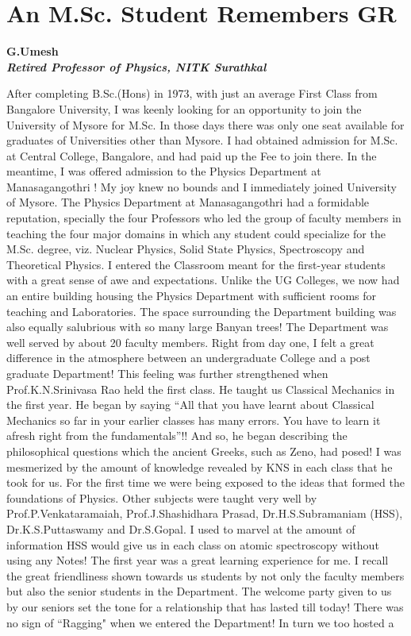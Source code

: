 \chapter{An M.Sc. Student Remembers GR}\label{chap8}


\begin{center}
\textbf{G.Umesh}\\
\textbf{\textit{Retired Professor of Physics, NITK Surathkal}}
\end{center}

After completing B.Sc.(Hons) in 1973, with just an average First Class from Bangalore University, I was keenly looking for an opportunity to join the University of Mysore for M.Sc. In those days there was only one seat available for graduates of Universities other than Mysore. I had obtained admission for M.Sc. at Central College, Bangalore, and had paid up the Fee to join there. In the meantime, I was offered admission to the Physics Department at Manasagangothri ! My joy knew no bounds and I immediately joined University of Mysore. The Physics Department at Manasagangothri had a formidable reputation, specially the four Professors who led the group of faculty members in teaching the four major domains in which any student could specialize for the M.Sc. degree, viz. Nuclear Physics, Solid State Physics, Spectroscopy and Theoretical Physics. I entered the Classroom meant for the first-year students with a great sense of awe and expectations. Unlike the UG Colleges, we now had an entire building housing the Physics Department with sufficient rooms for teaching and Laboratories. The space surrounding the Department building was also equally salubrious with so many large Banyan trees! The Department was well served by about 20 faculty members. Right from day one, I felt a great difference in the atmosphere between an undergraduate College and a post graduate Department! This feeling was further strengthened when Prof.K.N.Srinivasa Rao held the first class. He taught us Classical Mechanics in the first year. He began by saying  ``All that you have learnt about Classical Mechanics so far in your earlier classes has many errors. You have to learn it afresh right from the fundamentals”!! And so, he began describing the philosophical questions which the ancient Greeks, such as Zeno, had posed! I was mesmerized by the amount of knowledge revealed by KNS in each class that he took for us. For the first time we were being exposed to the ideas that formed the foundations of Physics. Other subjects were taught very well by Prof.P.Venkataramaiah, Prof.J.Shashidhara Prasad, Dr.H.S.Subramaniam (HSS), Dr.K.S.Puttaswamy and Dr.S.Gopal. I used to marvel at the amount of information HSS would give us in each class on atomic spectroscopy without using any Notes! The first year was a great learning experience for me. I recall the great friendliness shown towards us students by not only the faculty members but also the senior students in the Department. The welcome party given to us by our seniors set the tone for a relationship that has lasted till today! There was no sign of ``Ragging" when we entered the Department! In turn we too hosted a 